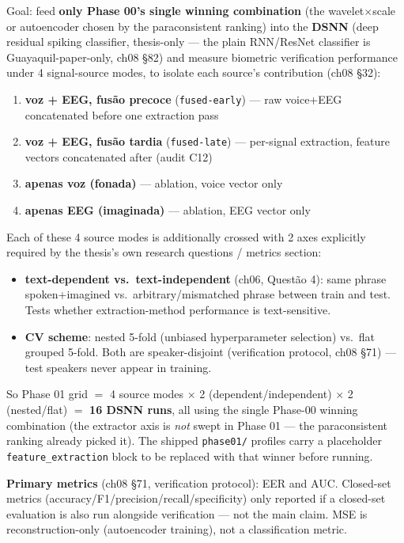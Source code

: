 Goal: feed \textbf{only Phase 00's single winning combination} (the wavelet$\times$scale or
autoencoder chosen by the paraconsistent ranking) into the \textbf{DSNN} (deep residual spiking
classifier, thesis-only --- the plain RNN/ResNet classifier is Guayaquil-paper-only, ch08 \S82) and
measure biometric verification performance under 4 signal-source modes, to isolate each source's
contribution (ch08 \S32):

\begin{enumerate}
    \item[00a] \textbf{voz + EEG, fusão precoce} (\texttt{fused-early}) --- raw voice+EEG concatenated before one extraction pass
    \item[00b] \textbf{voz + EEG, fusão tardia} (\texttt{fused-late}) --- per-signal extraction, feature vectors concatenated after (audit C12)
    \item[01] \textbf{apenas voz (fonada)} --- ablation, voice vector only
    \item[02] \textbf{apenas EEG (imaginada)} --- ablation, EEG vector only
\end{enumerate}

Each of these 4 source modes is additionally crossed with 2 axes explicitly required by the thesis's
own research questions / metrics section:

\begin{itemize}
    \item \textbf{text-dependent vs.\ text-independent} (ch06, Questão 4): same phrase spoken+imagined
    vs.\ arbitrary/mismatched phrase between train and test. Tests whether extraction-method
    performance is text-sensitive.
    \item \textbf{CV scheme}: nested 5-fold (unbiased hyperparameter selection) vs.\ flat grouped
    5-fold. Both are speaker-disjoint (verification protocol, ch08 \S71) --- test speakers never
    appear in training.
\end{itemize}

So Phase 01 grid $=$ 4 source modes $\times$ 2 (dependent/independent) $\times$ 2 (nested/flat)
$=$ \textbf{16 DSNN runs}, all using the single Phase-00 winning combination (the extractor axis is
\emph{not} swept in Phase 01 --- the paraconsistent ranking already picked it). The shipped
\texttt{phase01/} profiles carry a placeholder \texttt{feature\_extraction} block to be replaced with
that winner before running.

\textbf{Primary metrics} (ch08 \S71, verification protocol): EER and AUC. Closed-set metrics
(accuracy/F1/precision/recall/specificity) only reported if a closed-set evaluation is also run
alongside verification --- not the main claim. MSE is reconstruction-only (autoencoder training), not
a classification metric.

